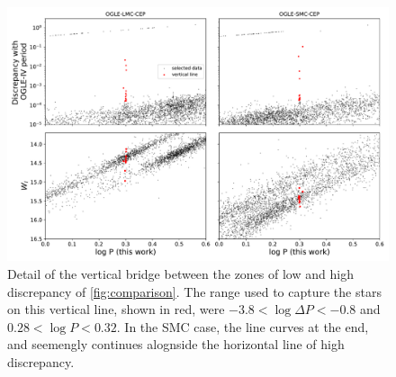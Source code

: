 \begin{figure}
	\centering
	\includegraphics[width=\textwidth]{img/vertial_line_detail.pdf}
	\caption[Detail of the vertical line on the discrepancy plot]{
		Detail of the vertical bridge between the zones of low and high discrepancy of \autoref{fig:comparison}.
		The range used to capture the stars on this vertical line, shown in red, were $-3.8<\log \Delta P < -0.8$ and $0.28 < \log P < 0.32 $.
		In the SMC case, the line curves at the end, and seemengly continues alognside the horizontal line of high discrepancy.
	}
	\label{fig:vertical-discrepancy}
\end{figure}


